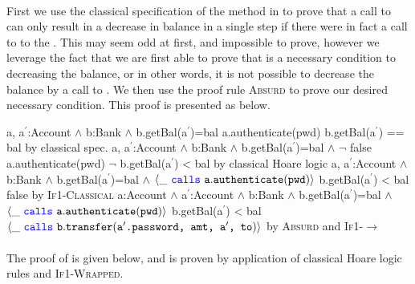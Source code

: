 \paragraph{\emph{\textbf{}}}First we use the classical specification of the  method in  to prove that a call to  can only result in 
a decrease in balance in a single step if there were in fact a call to  to the . This may seem 
odd at first, and impossible to prove, however we leverage the fact that we are first able to prove that 
is a necessary condition to decreasing the balance, or in other words, it is not possible to decrease the balance by a
call to . We then use the proof rule \textsc{Absurd} to prove our desired necessary condition.
This proof is presented as  below.
\\
\noindent
{
	\begin{proofexample}
			{\proofstepwithrule
				{\hoareEx
						{a, a$^\prime$:Account $\wedge$ b:Bank $\wedge$ b.getBal(a$^\prime$)=bal}
						{a.authenticate(pwd)}
						{b.getBal(a$^\prime$) == bal}
						}
					{by classical spec.}
			}
			{\proofstepwithrule
				{\hoareEx
						{a, a$^\prime$:Account $\wedge$ b:Bank $\wedge$ b.getBal(a$^\prime$)=bal $\wedge$ $\neg$ false}
						{a.authenticate(pwd)}
						{$\neg$ b.getBal(a$^\prime$) < bal}
						}
					{by classical Hoare logic}
			}
			{\proofstepwithrule
				{\onlyIfSingleExAlt
						{a, a$^\prime$:Account $\wedge$ b:Bank $\wedge$ b.getBal(a$^\prime$)=bal $\wedge$ $\langle \_\ {\color{blue}\texttt{calls}}\ {\texttt{a}}.{\texttt{authenticate}}({\texttt{pwd}}) \rangle$}
						{b.getBal(a$^\prime$) < bal}
						{false}
						}
					{by \textsc{If1-Classical}}
			}
			{\proofstepwithrule
				{\onlyIfSingleEx
						{a:Account $\wedge$ a$^\prime$:Account $\wedge$ b:Bank $\wedge$ b.getBal(a$^\prime$)=bal $\wedge$ $\langle \_\ {\color{blue}\texttt{calls}}\ {\texttt{a}}.{\texttt{authenticate}}({\texttt{pwd}}) \rangle$}
						{b.getBal(a$^\prime$) < bal}
						{$\langle \_\ {\color{blue}\texttt{calls}}\ {\texttt{b}}.{\texttt{transfer}}({\texttt{a$^\prime$.password, amt, a$^\prime$, to}}) \rangle$}
						}
					{by \textsc{Absurd} and \textsc{If1-}$\longrightarrow$}
			}
		\endproofsteps
	\end{proofexample}
}

\paragraph{\emph{\textbf{}}} The proof of  is given below, and is proven by application of classical Hoare logic rules and \textsc{If1-Wrapped}.

